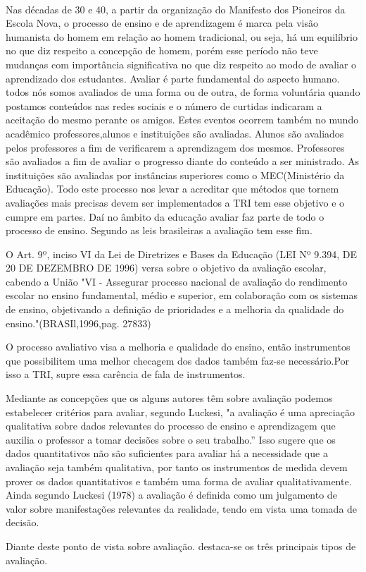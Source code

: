 	\paragraph{}
    	Nas décadas de 30 e 40, a partir da organização do Manifesto dos Pioneiros da Escola Nova, o processo de ensino e de aprendizagem é marca pela visão humanista do homem em relação ao homem tradicional, ou seja, há um equilíbrio no que diz respeito a concepção de homem, porém esse período não teve mudanças com importância significativa no que diz respeito ao modo de avaliar o aprendizado dos estudantes. Avaliar é parte fundamental do aspecto humano. todos nós somos avaliados de uma forma ou de outra, de forma voluntária quando postamos conteúdos nas redes sociais e o número de curtidas indicaram a aceitação do mesmo perante os amigos. Estes eventos ocorrem também no mundo acadêmico professores,alunos e instituições são avaliadas. Alunos são avaliados pelos professores a fim de verificarem a aprendizagem dos mesmos. Professores são avaliados a fim de avaliar o progresso diante do conteúdo a ser ministrado. As instituições são avaliadas por instâncias superiores como o MEC(Ministério da Educação). Todo este processo nos levar a acreditar que métodos  que tornem avaliações mais precisas devem ser implementados a TRI tem esse objetivo e o cumpre em partes. Daí no âmbito da educação avaliar faz parte de todo o processo de ensino. Segundo as leis brasileiras a avaliação tem esse fim.
	\par
	    \textcite{LDB} O Art. 9º, inciso VI da Lei de Diretrizes e Bases da Educação (LEI Nº 9.394, DE 20 DE DEZEMBRO DE 1996) versa sobre o objetivo da avaliação escolar, cabendo a União
		"VI - Assegurar processo nacional de avaliação do rendimento escolar no ensino fundamental, médio e superior, em colaboração com os sistemas de ensino, objetivando a definição de prioridades e a melhoria da qualidade do ensino."(BRASIl,1996,pag. 27833)
	\par
	    O processo avaliativo visa a melhoria e qualidade do ensino, então instrumentos que possibilitem uma melhor checagem dos dados também faz-se necessário.Por isso a TRI, supre essa carência de fala de instrumentos. 
	\par
	    Mediante as concepções que os alguns autores têm sobre avaliação podemos estabelecer critérios para avaliar, segundo Luckesi, "a avaliação é uma apreciação qualitativa sobre dados relevantes do processo de ensino e aprendizagem que auxilia o professor a tomar decisões sobre o seu trabalho.” Isso sugere que os dados quantitativos não são suficientes para avaliar há a necessidade que a avaliação seja também qualitativa, por tanto os instrumentos de medida devem prover os dados quantitativos e também uma forma de avaliar qualitativamente. Ainda segundo Luckesi (1978) a avaliação é definida como um julgamento de valor sobre manifestações relevantes da realidade, tendo em vista uma tomada de decisão.
	\par
	    Diante deste ponto de vista sobre avaliação. destaca-se os três principais tipos de avaliação.
